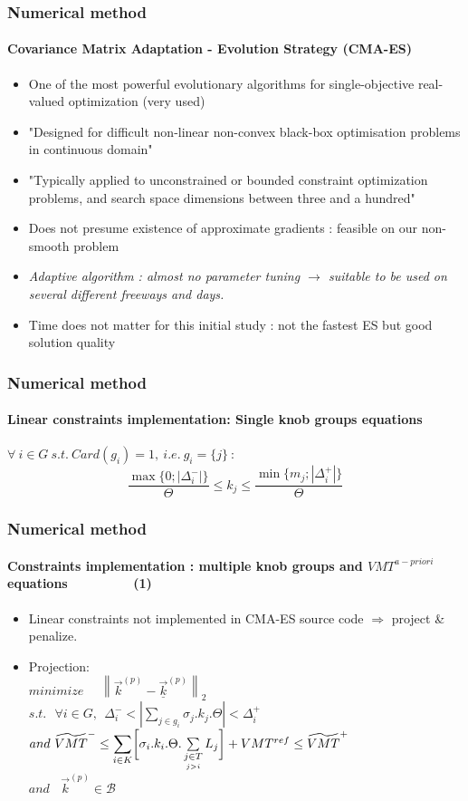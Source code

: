 \documentclass[fleqn]{beamer}
\newcommand\norm[1]{\left\lVert#1\right\rVert}
\begin{document}
\begin{frame}
	\frametitle{Numerical method}
	\framesubtitle{Covariance Matrix Adaptation - Evolution Strategy (CMA-ES)}
	\begin{itemize}
		\item One of the most powerful evolutionary algorithms for single-objective real-valued optimization (very used) 
		\item "Designed for difficult non-linear non-convex black-box optimisation problems in continuous domain"
		\item "Typically applied to unconstrained or bounded constraint optimization problems, and search space dimensions between three and a hundred"
		\item Does not presume existence of approximate gradients : feasible on our non-smooth problem
		\item \em Adaptive \em algorithm : almost no parameter tuning $\rightarrow$ suitable to be used on several different freeways and days.
		\item Time does not matter for this initial study : not the fastest ES but good solution quality 	
	\end{itemize}
\end{frame}


\begin{frame}
	\frametitle{Numerical method}
	\framesubtitle{Linear constraints implementation: Single knob groups equations}
	$\forall\ i\in G\ s.t.\ Card(g_{i})=1,\ i.e.\ g_{i}=\{j\}\ :$
\begin{equation}
	\frac{\max{\big\{0;|\Delta_{i}^{-}|\big\}}}{\Theta}\leq k_{j} \leq \frac{\min{\big\{m_{j};|\Delta_{i}^{+}|\big\}}}{\Theta}
\end{equation}
\end{frame}


\begin{frame}
	\frametitle{Numerical method}
	\framesubtitle{Constraints implementation : multiple knob groups and $VMT^{a-priori}$ equations~~~~~~~~~(1)}
	\begin{itemize}
	 \item Linear constraints not implemented in CMA-ES source code $\Rightarrow$ project \& penalize.
	 \item Projection: \\ 
	 $minimize \ \ \ \ \ \ \norm{\vec{k}^{(p)}-\underline{\vec{k}}^{(p)}}_{2}$\\
$s.t.\ \ \ \forall i\in{G}, \ \ \Delta_{i}^{-}< |\sum_{j\in{g_{i}}} \sigma_{j}.k_{j}.\Theta|<\Delta_{i}^{+}$\\
$and\ \widetilde{VMT}^{-}\leq\mathlarger{\sum\limits_{i\in K}}\biggl[\sigma_{i}.k_{i}.\Theta.	\sum\limits_{\underset{j>i}{j\in T}}L_{j}\biggr]+VMT^{ref}\leq \widetilde{VMT}^{+}\nonumber $\\
$and\ \ \ \ \vec{k}^{(p)}\in \mathscr{B}$\\
	\end{itemize}\end{frame}
\end{document}
